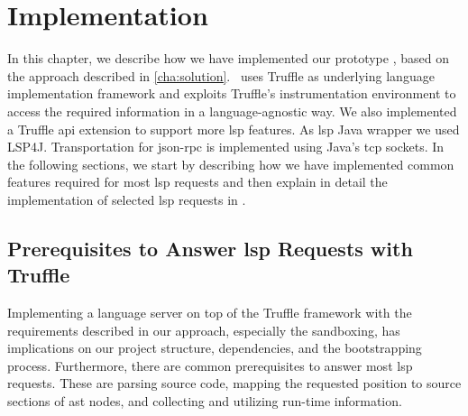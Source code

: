 
\section{Implementation}
\label{cha:implementation}

    In this chapter, we describe how we have implemented our prototype \graallsp, based on the approach described in \autoref{cha:solution}. \graallsp~uses Truffle as underlying language implementation framework and exploits Truffle's instrumentation environment to access the required information in a language-agnostic way. We also implemented a Truffle \ac{api} extension to support more \ac{lsp} features. As \ac{lsp} Java wrapper we used LSP4J. Transportation for \acs{json}-\acs{rpc} is implemented using Java's \acs{tcp} sockets. In the following sections, we start by describing how we have implemented common features required for most \ac{lsp} requests and then explain in detail the implementation of selected \ac{lsp} requests in \graallsp.

    \subsection{Prerequisites to Answer \acs{lsp} Requests with Truffle}
    Implementing a language server on top of the Truffle framework with the requirements described in our approach, especially the sandboxing, has implications on our project structure, dependencies, and the bootstrapping process. Furthermore, there are common prerequisites to answer most \ac{lsp} requests. These are parsing source code, mapping the requested position to source sections of \ac{ast} nodes, and collecting and utilizing run-time information.

